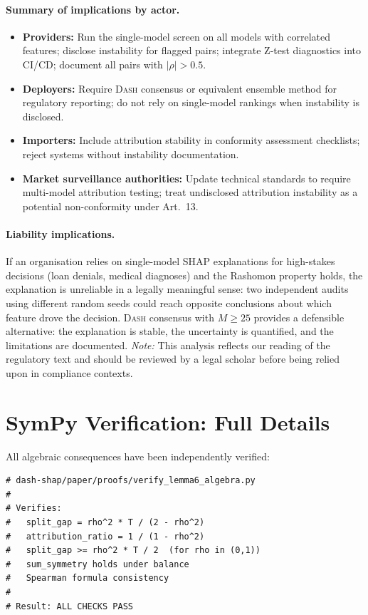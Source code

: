 \documentclass{article}
\newcommand{\DASH}{\textsc{Dash}}
\begin{document}
\paragraph{Summary of implications by actor.}
\begin{itemize}
    \item \textbf{Providers:} Run the single-model screen on all models with correlated features; disclose instability for flagged pairs; integrate Z-test diagnostics into CI/CD; document all pairs with $|\rho| > 0.5$.
    \item \textbf{Deployers:} Require \DASH{} consensus or equivalent ensemble method for regulatory reporting; do not rely on single-model rankings when instability is disclosed.
    \item \textbf{Importers:} Include attribution stability in conformity assessment checklists; reject systems without instability documentation.
    \item \textbf{Market surveillance authorities:} Update technical standards to require multi-model attribution testing; treat undisclosed attribution instability as a potential non-conformity under Art.~13.
\end{itemize}

\paragraph{Liability implications.}
If an organisation relies on single-model SHAP explanations for high-stakes decisions (loan denials, medical diagnoses) and the Rashomon property holds, the explanation is unreliable in a legally meaningful sense: two independent audits using different random seeds could reach opposite conclusions about which feature drove the decision. \DASH{} consensus with $M \geq 25$ provides a defensible alternative: the explanation is stable, the uncertainty is quantified, and the limitations are documented. \emph{Note:} This analysis reflects our reading of the regulatory text and should be reviewed by a legal scholar before being relied upon in compliance contexts.

\section{SymPy Verification: Full Details}

All algebraic consequences have been independently verified:

\begin{verbatim}
# dash-shap/paper/proofs/verify_lemma6_algebra.py
#
# Verifies:
#   split_gap = rho^2 * T / (2 - rho^2)
#   attribution_ratio = 1 / (1 - rho^2)
#   split_gap >= rho^2 * T / 2  (for rho in (0,1))
#   sum_symmetry holds under balance
#   Spearman formula consistency
#
# Result: ALL CHECKS PASS
\end{verbatim}
\end{document}
